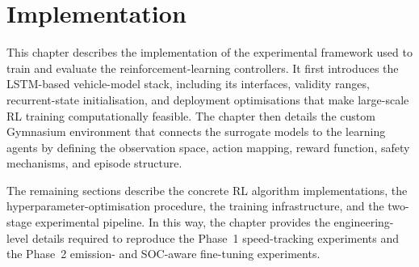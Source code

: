 \chapter{Implementation}
\label{chap:experimental_setup}


This chapter describes the implementation of the experimental framework used to train and evaluate the reinforcement-learning controllers. It first introduces the \ac{LSTM}-based vehicle-model stack, including its interfaces, validity ranges, recurrent-state initialisation, and deployment optimisations that make large-scale \ac{RL} training computationally feasible. The chapter then details the custom Gymnasium \cite{towers_gymnasium_2024} environment that connects the surrogate models to the learning agents by defining the observation space, action mapping, reward function, safety mechanisms, and episode structure.

The remaining sections describe the concrete \ac{RL} algorithm implementations, the hyperparameter-optimisation procedure, the training infrastructure, and the two-stage experimental pipeline. In this way, the chapter provides the engineering-level details required to reproduce the Phase~1 speed-tracking experiments and the Phase~2 emission- and \ac{SOC}-aware fine-tuning experiments.

